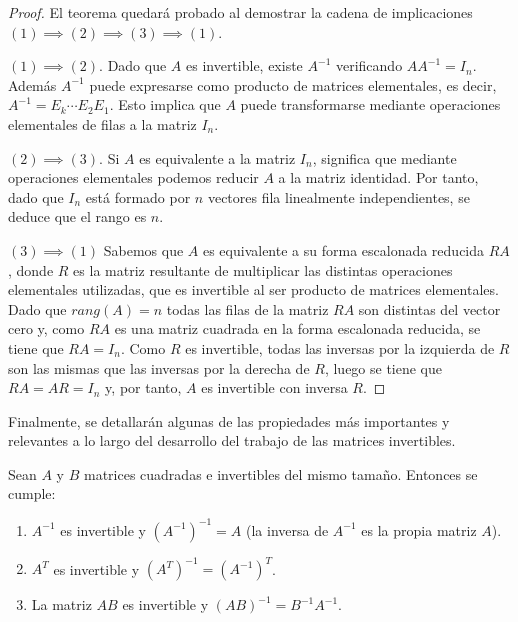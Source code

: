 \begin{proof} El teorema quedará probado al demostrar la cadena de implicaciones \textbf{\((1) \implies (2) \implies (3) \implies (1)\)}.\newline

    \textbf{\((1) \implies (2)\)}. Dado que $A$ es invertible, existe $A^{-1}$ verificando $AA^{-1}=I_n$. Además $A^{-1}$ puede expresarse como producto de matrices elementales, es decir, $A^{-1} = E_k \cdots E_2 E_1$. Esto implica que $A$ puede transformarse mediante operaciones elementales de filas a la matriz $I_n$.\newline

    \textbf{\((2) \implies (3)\)}. Si $A$ es equivalente a la matriz $I_n$, significa que mediante operaciones elementales podemos reducir $A$ a la matriz identidad. Por tanto, dado que $I_n$ está formado por $n$ vectores fila linealmente independientes, se deduce que el rango es $n$.\newline

    \textbf{\((3) \implies (1)\)} Sabemos que $A$ es equivalente a su forma escalonada reducida $RA$, donde $R$ es la matriz resultante de multiplicar las distintas operaciones elementales utilizadas, que es invertible al ser producto de matrices elementales. Dado que $rang(A) = n$ todas las filas de la matriz $RA$ son distintas del vector cero y, como $RA$ es una matriz cuadrada en la forma escalonada reducida, se tiene que $RA =I_n$. Como $R$ es invertible, todas las inversas por la izquierda de $R$ son las mismas que las inversas por la derecha de $R$, luego se tiene que $RA = AR = I_n$ y, por tanto, $A$ es invertible con inversa $R$.\newline
\end{proof}

Finalmente, se detallarán algunas de las propiedades más importantes y relevantes a lo largo del desarrollo del trabajo de las matrices invertibles.

\begin{teorema}
    Sean $A$ y $B$ matrices cuadradas e invertibles del mismo tamaño. Entonces se cumple:

    \begin{enumerate}
        \item $A^{-1}$ es invertible y ${(A^{-1})}^{-1} = A$ (la inversa de $A^{-1}$ es la propia matriz $A$).
        \item $A^{T}$ es invertible y ${(A^{T})}^{-1} = {(A^{-1})}^{T}$.
        \item La matriz $AB$ es invertible y ${(AB)}^{-1} = B^{-1}A^{-1}$.
    \end{enumerate}
\end{teorema}

